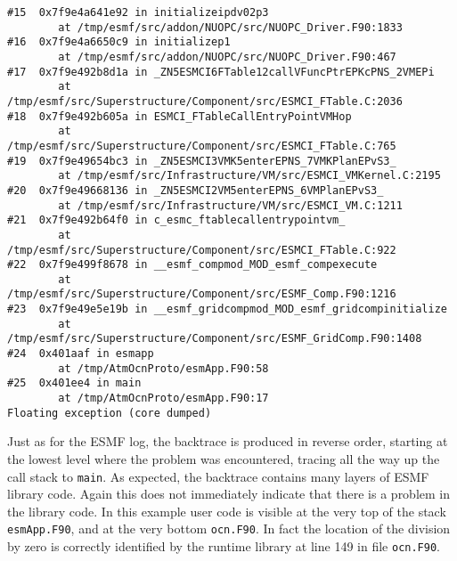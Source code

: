 \begin{verbatim}
#15  0x7f9e4a641e92 in initializeipdv02p3
        at /tmp/esmf/src/addon/NUOPC/src/NUOPC_Driver.F90:1833
#16  0x7f9e4a6650c9 in initializep1
        at /tmp/esmf/src/addon/NUOPC/src/NUOPC_Driver.F90:467
#17  0x7f9e492b8d1a in _ZN5ESMCI6FTable12callVFuncPtrEPKcPNS_2VMEPi
        at /tmp/esmf/src/Superstructure/Component/src/ESMCI_FTable.C:2036
#18  0x7f9e492b605a in ESMCI_FTableCallEntryPointVMHop
        at /tmp/esmf/src/Superstructure/Component/src/ESMCI_FTable.C:765
#19  0x7f9e49654bc3 in _ZN5ESMCI3VMK5enterEPNS_7VMKPlanEPvS3_
        at /tmp/esmf/src/Infrastructure/VM/src/ESMCI_VMKernel.C:2195
#20  0x7f9e49668136 in _ZN5ESMCI2VM5enterEPNS_6VMPlanEPvS3_
        at /tmp/esmf/src/Infrastructure/VM/src/ESMCI_VM.C:1211
#21  0x7f9e492b64f0 in c_esmc_ftablecallentrypointvm_
        at /tmp/esmf/src/Superstructure/Component/src/ESMCI_FTable.C:922
#22  0x7f9e499f8678 in __esmf_compmod_MOD_esmf_compexecute
        at /tmp/esmf/src/Superstructure/Component/src/ESMF_Comp.F90:1216
#23  0x7f9e49e5e19b in __esmf_gridcompmod_MOD_esmf_gridcompinitialize
        at /tmp/esmf/src/Superstructure/Component/src/ESMF_GridComp.F90:1408
#24  0x401aaf in esmapp
        at /tmp/AtmOcnProto/esmApp.F90:58
#25  0x401ee4 in main
        at /tmp/AtmOcnProto/esmApp.F90:17
Floating exception (core dumped)
\end{verbatim}

Just as for the ESMF log, the backtrace is produced in reverse order, starting
at the lowest level where the problem was encountered, tracing all the way up
the call stack to {\tt main}. As expected, the backtrace contains many
layers of ESMF library code. Again this does not immediately indicate that there
is a problem in the library code. In this example user code is visible at the
very top of the stack {\tt esmApp.F90}, and at the very bottom {\tt ocn.F90}.
In fact the location of the division by zero is correctly identified by the
runtime library at line 149 in file {\tt ocn.F90}.
